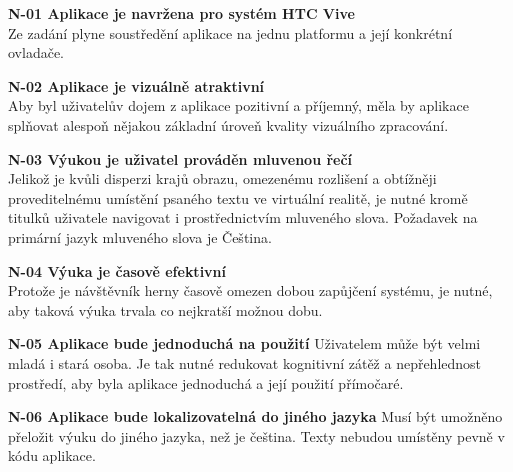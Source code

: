 \textbf{N-01 Aplikace je navržena pro systém HTC Vive}\\
Ze zadání plyne soustředění aplikace na jednu platformu a její konkrétní
ovladače.

\textbf{N-02 Aplikace je vizuálně atraktivní}\\
Aby byl uživatelův dojem z aplikace pozitivní a příjemný, měla by
aplikace splňovat alespoň nějakou základní úroveň kvality vizuálního
zpracování.

\textbf{N-03 Výukou je uživatel prováděn mluvenou řečí}\\
Jelikož je kvůli disperzi krajů obrazu, omezenému rozlišení a obtížněji
proveditelnému umístění psaného textu ve virtuální realitě, je nutné
kromě titulků uživatele navigovat i prostřednictvím mluveného slova.
Požadavek na primární jazyk mluveného slova je Čeština.

\textbf{N-04 Výuka je časově efektivní}\\
Protože je návštěvník herny časově omezen dobou zapůjčení systému, je
nutné, aby taková výuka trvala co nejkratší možnou dobu.

\textbf{N-05 Aplikace bude jednoduchá na použití} Uživatelem může být
velmi mladá i stará osoba. Je tak nutné redukovat kognitivní zátěž a
nepřehlednost prostředí, aby byla aplikace jednoduchá a její použití
přímočaré.

\textbf{N-06 Aplikace bude lokalizovatelná do jiného jazyka} Musí být
umožněno přeložit výuku do jiného jazyka, než je čeština. Texty nebudou
umístěny pevně v kódu aplikace.
